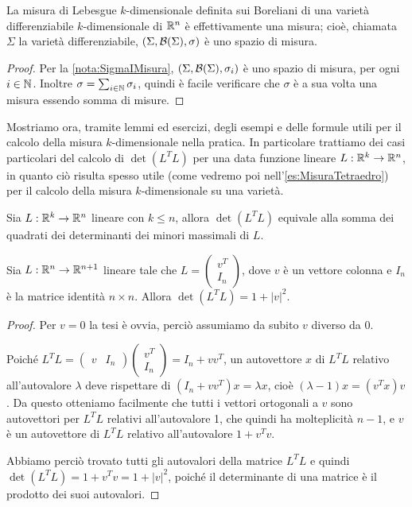 \begin{theorem}
	La misura di Lebesgue $k$-dimensionale definita sui Boreliani di una varietà differenziabile $k$-dimensionale di $\mathbb R^n$ è effettivamente una misura; cioè, chiamata $\Sigma$ la varietà differenziabile, $(\Sigma,\mathcal B(\Sigma),\sigma)$ è uno spazio di misura.
\end{theorem}
\begin{proof}
	Per la \cref{nota:SigmaIMisura}, $(\Sigma,\mathcal B(\Sigma),\sigma_i)$ è uno spazio di misura, per ogni $i\in\mathbb N$. Inoltre $\sigma=\sum_{i\in\mathbb N}\sigma_i$, quindi è facile verificare che $\sigma$ è a sua volta una misura essendo somma di misure.
\end{proof}

Mostriamo ora, tramite lemmi ed esercizi, degli esempi e delle formule utili per il calcolo della misura $k$-dimensionale nella pratica. In particolare trattiamo dei casi particolari del calcolo di $\det(L^TL)$ per una data funzione lineare $L:\mathbb R^k\to\mathbb R^n$, in quanto ciò risulta spesso utile (come vedremo poi nell'\cref{es:MisuraTetraedro}) per il calcolo della misura $k$-dimensionale su una varietà.

\begin{exercise}\label{es:DeterminanteProdottoTrasposta}
	Sia $L:\mathbb R^k\to\mathbb R^n$ lineare con $k\le n$, allora $\det(L^TL)$ equivale alla somma dei quadrati dei determinanti dei minori massimali di $L$.
\end{exercise}

\begin{lemma}\label{lemma:DeterminanteMatriceQuasiIdentita}
	Sia $L:\mathbb R^n\to\mathbb R^{n+1}$ lineare tale che $L=\begin{pmatrix} v^T \\ I_n \end{pmatrix}$, dove $v$ è un vettore colonna e $I_n$ è la matrice identità $n\times n$. Allora $\det(L^TL)=1+\lvert v \rvert ^2$.
\end{lemma}
\begin{proof}
	Per $v=0$ la tesi è ovvia, perciò assumiamo da subito $v$ diverso da 0.
	
	Poiché $L^TL=\begin{pmatrix} v & I_n \end{pmatrix}\begin{pmatrix} v^T \\ I_n \end{pmatrix}=I_n+vv^T$, un autovettore $x$ di $L^TL$ relativo all'autovalore $\lambda$ deve rispettare di $(I_n+vv^T)x=\lambda x$, cioè $(\lambda-1)x=(v^Tx)v$. Da questo otteniamo facilmente che tutti i vettori ortogonali a $v$ sono autovettori per $L^TL$ relativi all'autovalore 1, che quindi ha molteplicità $n-1$, e $v$ è un autovettore di $L^TL$ relativo all'autovalore $1+v^Tv$.
	
	Abbiamo perciò trovato tutti gli autovalori della matrice $L^TL$ e quindi $\det(L^TL)=1+v^Tv=1+\lvert v \rvert ^2$, poiché il determinante di una matrice è il prodotto dei suoi autovalori.
\end{proof}

